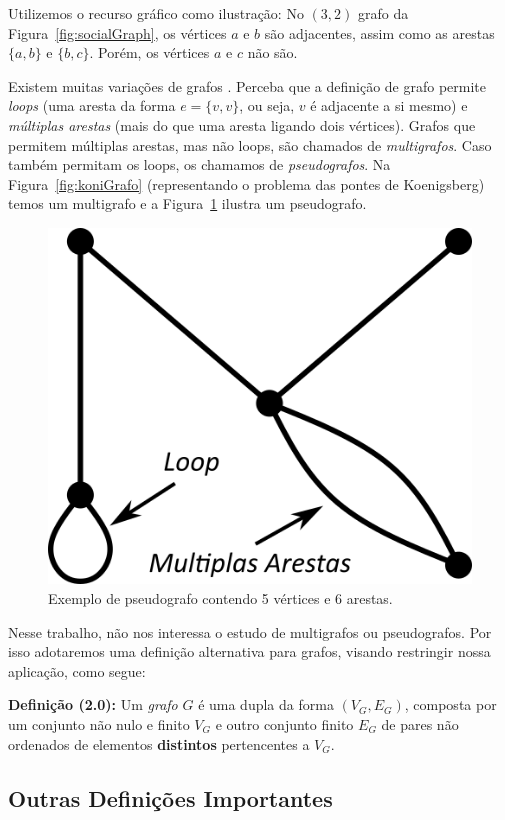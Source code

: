 \documentclass[a4paper,12pt]{article}
\begin{document}
Utilizemos o recurso gráfico como ilustração: No $(3,2)$ grafo da Figura~\ref{fig:socialGraph}, os vértices $a$ e $b$ são adjacentes, assim como as arestas $\{a, b\}$ e $\{b, c\}$. Porém, os vértices $a$ e $c$ não são.

Existem muitas variações de grafos \cite{graphTheoryFHarary}. Perceba que a definição de grafo permite \textit{loops} (uma aresta da forma $e = \{v,v\}$, ou seja, $v$ é adjacente a si mesmo) e \textit{múltiplas arestas} (mais do que uma aresta ligando dois vértices). Grafos que permitem múltiplas arestas, mas não loops, são chamados de \textit{multigrafos}. Caso também permitam os loops, os chamamos de \textit{pseudografos}. Na Figura~\ref{fig:koniGrafo} (representando o problema das pontes de Koenigsberg) temos um multigrafo e a Figura~\ref{fig:pseudograph} ilustra um pseudografo.

\begin{figure}[H]
	\begin{center}
		\includegraphics[width=0.28\linewidth]{pseudograph.png}
	\end{center}
	\caption{Exemplo de pseudografo contendo 5 vértices e 6 arestas.}
	\label{fig:pseudograph}
\end{figure}

Nesse trabalho, não nos interessa o estudo de multigrafos ou pseudografos. Por isso adotaremos uma definição alternativa para grafos, visando restringir nossa aplicação, como segue:

\begin{center}
	\begin{minipage}{0.9 \linewidth}
		\textbf{Definição (2.0):} Um \textit{grafo} $G$ é uma dupla da forma $(V_G,E_G)$, composta por um conjunto não nulo e finito $V_G$ e outro conjunto finito $E_G$ de pares não ordenados de elementos \textbf{distintos} pertencentes a $V_G$.
	\end{minipage}
\end{center} 

\subsection{Outras Definições Importantes}
\end{document}

